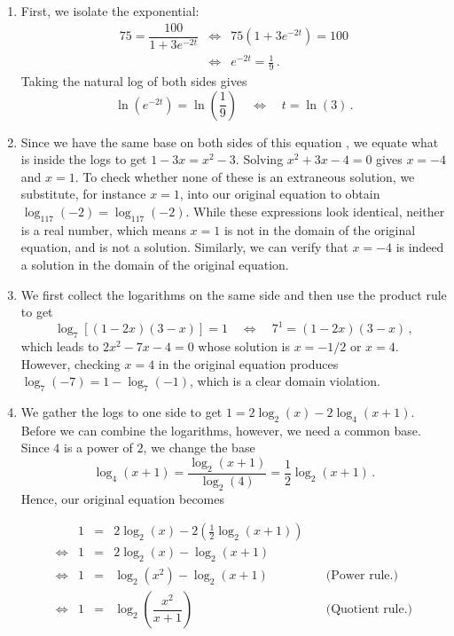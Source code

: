\begin{example}
\begin{enumerate}
\item  First, we isolate the exponential:
$$
\begin{array}{rcl}
75=\dfrac{100}{1+3e^{-2t}}&\Leftrightarrow&75\left(1 + 3e^{-2t}\right) = 100\\[0.2cm]
&\Leftrightarrow&e^{-2t} = \frac{1}{9}\,.
\end{array}
$$
Taking the natural log of both sides gives 
$$\ln\left(e^{-2t}\right) = \ln\left( \frac{1}{9} \right)\quad\Leftrightarrow\quad t=\ln(3)\,.$$ 

\item  Since we have the same base on both sides of this equation , we equate what is inside the logs to get $1-3x = x^2-3$.  Solving $x^2+3x-4 = 0$ gives $x=-4$ and $x=1$.   To check whether none of these is an extraneous solution, we substitute, for instance $x=1$, into our original equation to obtain  $\log_{117}(-2) =  \log_{117}(-2)$.  While these expressions look identical, neither is a real number, which means $x=1$ is not in the domain of the original equation, and is not a solution. Similarly, we can verify that $x=-4$ is indeed a solution in the domain of the original equation. 

\item We first collect the logarithms on the same side and then use the product rule to get 
$$\log_{7}[(1-2x)(3-x)]=1\quad \Leftrightarrow\quad 7^{1} = (1-2x)(3-x)\,,$$ 
 which leads to  $2x^2-7x-4=0$ whose solution is  $x = -1/2$ or $x=4$.  However, checking $x=4$ in the original equation produces $\log_{7}(-7) = 1 - \log_{7}(-1)$, which is a clear domain violation.

\item We gather the logs to one side to get $1 = 2 \log_{2}(x) - 2 \log_{4}(x+1)$.  Before we can combine the logarithms, however, we need a common base.  Since $4$ is a power of $2$, we change the base \[\log_{4}(x+1) = \frac{\log_{2}(x+1)}{\log_{2}(4)} = \dfrac{1}{2} \log_{2}(x+1)\,.\] Hence, our original equation becomes  

\[ \begin{array}{rrclr}

&1 & = & 2 \log_{2}(x) - 2 \left(\frac{1}{2} \log_{2}(x+1)\right) & \\ [2pt]
\Leftrightarrow&1 &= & 2\log_{2}(x) - \log_{2}(x+1) & \\ [2pt]
\Leftrightarrow&1 & = & \log_{2}\left(x^2\right) - \log_{2}(x+1) & \quad\text{(Power rule.)} \\ [6pt]
\Leftrightarrow&1 & = & \log_{2}\left( \dfrac{x^{2}}{x+1}\right) & \quad\text{(Quotient rule.)} \\ \end{array}\]


\end{enumerate}
\end{example}

